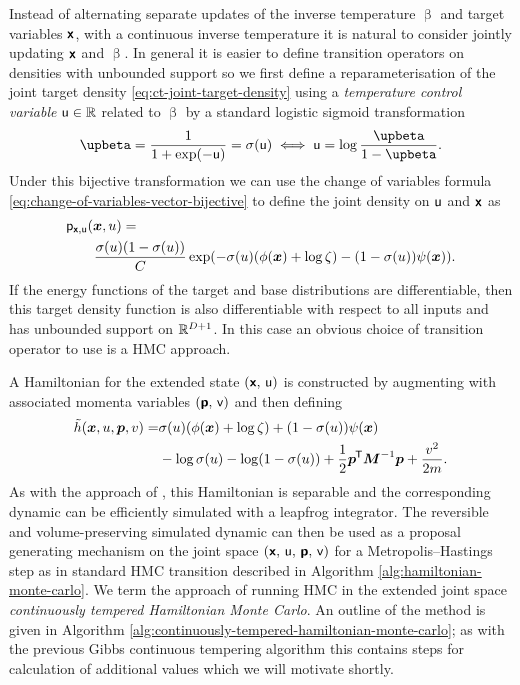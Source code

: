 Instead of alternating separate updates of the inverse temperature $\upbeta$ and target variables $\boldsymbol{\mathsf{x}}$, with a continuous inverse temperature it is natural to consider jointly updating $\boldsymbol{\mathsf{x}}$ and $\upbeta$. In general it is easier to define transition operators on densities with unbounded support so we first define a reparameterisation of the joint target density \eqref{eq:ct-joint-target-density} using a \emph{temperature control variable} $\mathsf{u} \in \mathbb{R}$ related to $\upbeta$ by a standard logistic sigmoid transformation
\begin{equation}\label{eq:temperature-control-function-sigmoid}
  \upbeta = \frac{1}{1 + \exp(-\rvar{u})} = \sigma(\rvar{u})
  \iff
  \rvar{u} = \log \frac{\upbeta}{1-\upbeta}.
\end{equation}
Under this bijective transformation we can use the change of variables formula \eqref{eq:change-of-variables-vector-bijective} to define the joint density on $\mathsf{u}$ and $\boldsymbol{\mathsf{x}}$ as
\begin{align}\label{eq:ct-joint-target-density-u}
&\pden{\rvct{x},\rvar{u}}(\vct{x},u) = \,\\ \nonumber
&\qquad\frac{\sigma(u)\lpa 1 - \sigma(u)\rpa}{C}
\exp\lpa
  -\sigma(u)\lpa \phi(\vct{x}) + \log\zeta\rpa - \lpa 1 - \sigma(u)\rpa\psi(\vct{x})
\rpa.
\end{align}
If the energy functions of the target and base distributions are differentiable, then this target density function is also differentiable with respect to all inputs and has unbounded support on $\mathbb{R}^{D+1}$. In this case an obvious choice of transition operator to use is a \ac{HMC} approach.%

A Hamiltonian for the extended state $(\boldsymbol{\mathsf{x}},\,\mathsf{u})$ is constructed by augmenting with associated momenta variables $(\boldsymbol{\mathsf{p}},\,\mathsf{v})$ and then defining
\begin{align}\nonumber
  \extended{\hamiltonian}(\vct{x},u,\vct{p},v) =&
  \sigma(u) \lpa \phi(\vct{x}) + \log\zeta\rpa + 
  \lpa 1 - \sigma(u) \rpa \psi(\vct{x}) \\ \label{eq:cthmc-hamiltonian}
  &- \log\sigma(u) - \log\lpa 1- \sigma(u)\rpa +
  \frac{1}{2} \vct{p}\tr\mtx{M}^{-1}\vct{p} + \frac{v^2}{2m}.
\end{align}
As with the approach of \citep{gobbo2015extended}, this Hamiltonian is separable and the corresponding dynamic can be efficiently simulated with a leapfrog integrator. The reversible and volume-preserving simulated dynamic can then be used as a proposal generating mechanism on the joint space $(\boldsymbol{\mathsf{x}},\,\mathsf{u},\,\boldsymbol{\mathsf{p}},\,\mathsf{v})$ for a Metropolis--Hastings step as in standard \ac{HMC} transition described in Algorithm \ref{alg:hamiltonian-monte-carlo}. We term the approach of running \ac{HMC} in the extended joint space \emph{continuously tempered Hamiltonian Monte Carlo}. An outline of the method is given in Algorithm \ref{alg:continuously-tempered-hamiltonian-monte-carlo}; as with the previous Gibbs continuous tempering algorithm this contains steps for calculation of additional values which we will motivate shortly.

